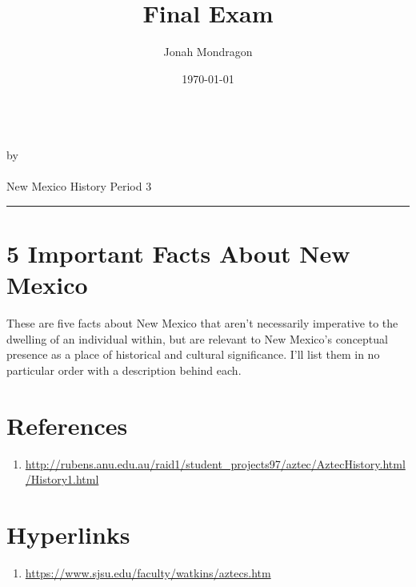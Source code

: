 \documentclass[12pt]{article}
\newcommand{\PutTitle}[1]
{
    \begin{center}
        {\huge\bfseries\thetitle}\\
        by \theauthor\\
        \thedate\\
        #1        
    \end{center}
    \hrule
    \vspace{2ex}
}
\begin{document}
\title{Final Exam}
\author{Jonah Mondragon}
\date{\today}
\PutTitle{New Mexico History Period 3}
\pagestyle{headings}

\section*{5 Important Facts About New Mexico}
These are five facts about New Mexico that aren't necessarily imperative to the dwelling of an individual within, but are relevant to New Mexico's conceptual presence as a place of historical and cultural significance.
I'll list them in no particular order with a description behind each. 






\newpage
\section*{References}
\begin{enumerate}
    \item{\url{http://rubens.anu.edu.au/raid1/student_projects97/aztec/AztecHistory.html/History1.html}}
\end{enumerate}
\section*{Hyperlinks}
\begin{enumerate}
    \item{\url{https://www.sjsu.edu/faculty/watkins/aztecs.htm}}
\end{enumerate}
\end{document}
